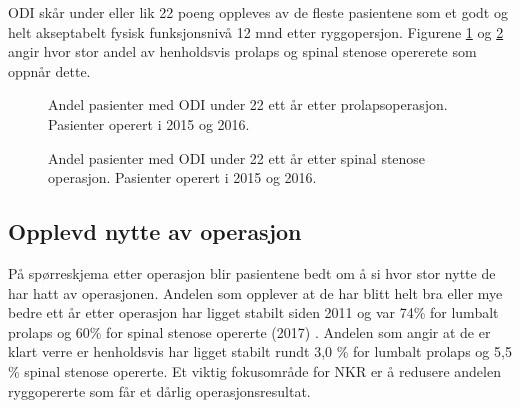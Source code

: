\documentclass [norsk,a4paper,twoside]{article}\usepackage[]{graphicx}\usepackage[]{color}
\begin{document}
\clearpage


ODI skår under eller lik 22 poeng oppleves av de fleste pasientene som et godt og helt akseptabelt fysisk funksjonsnivå 12 mnd etter ryggopersjon. Figurene \ref{fig:Osw22Pro} og \ref{fig:Osw22SS} angir hvor stor andel av henholdsvis prolaps og spinal stenose opererete som oppnår dette.

\begin{figure}[ht]
\caption{\label{fig:Osw22Pro}   Andel pasienter med ODI under 22 ett år
      etter prolapsoperasjon. Pasienter operert i 2015 og 2016.}
\end{figure}

\begin{figure}[ht]
\caption{\label{fig:Osw22SS}   Andel pasienter med ODI under 22 ett år
      etter spinal stenose operasjon. Pasienter operert i 2015 og 2016.}
\end{figure}


\clearpage

\subsection{Opplevd nytte av operasjon}
På spørreskjema etter operasjon blir pasientene bedt om å si hvor stor nytte de har hatt av operasjonen.
Andelen som opplever at de har blitt helt bra eller mye bedre ett år etter operasjon har ligget stabilt siden 2011 og var 74\% for lumbalt prolaps og 60\% for spinal stenose opererte (2017) . Andelen  som angir at de er klart verre er henholdsvis har ligget stabilt rundt 3,0 \% for lumbalt prolaps og 5,5 \% spinal stenose opererte.
Et viktig fokusområde for NKR er å redusere andelen ryggopererte som får et dårlig operasjonsresultat.



      
\end{document}
